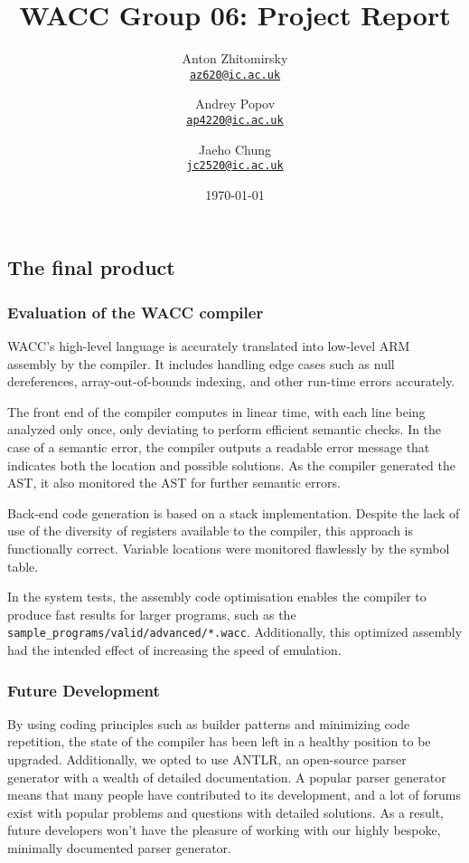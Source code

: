 \documentclass[a4paper,12pt]{article}
\title{WACC Group 06: Project Report}
\author{
    Anton Zhitomirsky \\ \texttt{\href{mailto:ps1620@ic.ac.uk}{az620@ic.ac.uk}}
    \and
    Andrey Popov \\ \texttt{\href{mailto:ap4220@ic.ac.uk}{ap4220@ic.ac.uk}}
    \and
    Jaeho Chung \\ \texttt{\href{mailto:jc2520@ic.ac.uk}{jc2520@ic.ac.uk}}
}
\date\today
\newcommand{\shell}[1]{\lstinline!#1!}
\begin{document}
\sloppy

\maketitle

\subsection*{The final product}

\subsubsection*{Evaluation of the WACC compiler}

WACC's high-level language is accurately translated into low-level ARM assembly by the compiler. It includes handling edge cases such as null dereferences, array-out-of-bounds indexing, and other run-time errors accurately. 

The front end of the compiler computes in linear time, with each line being analyzed only once, only deviating to perform efficient semantic checks. In the case of a semantic error, the compiler outputs a readable error message that indicates both the location and possible solutions. As the compiler generated the AST, it also monitored the AST for further semantic errors. 

Back-end code generation is based on a stack implementation. Despite the lack of use of the diversity of registers available to the compiler, this approach is functionally correct. Variable locations were monitored flawlessly by the symbol table.

In the system tests, the assembly code optimisation enables the compiler to produce fast results for larger programs, such as the \shell{sample_programs/valid/advanced/*.wacc}. Additionally, this optimized assembly had the intended effect of increasing the speed of emulation.

\subsubsection*{Future Development}

By using coding principles such as builder patterns and minimizing code repetition, the state of the compiler has been left in a healthy position to be upgraded. Additionally, we opted to use ANTLR, an open-source parser generator with a wealth of detailed documentation. A popular parser generator means that many people have contributed to its development, and a lot of forums exist with popular problems and questions with detailed solutions. As a result, future developers won't have the pleasure of working with our highly bespoke, minimally documented parser generator.
\end{document}
